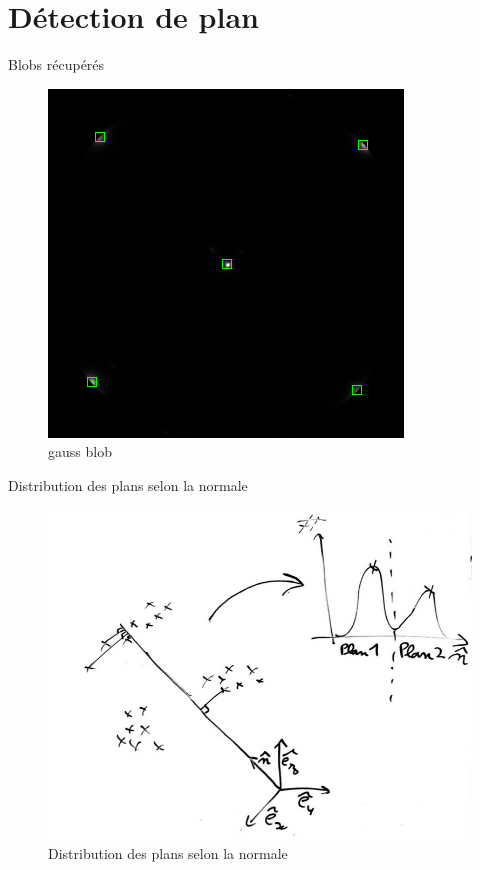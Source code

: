 \documentclass[11pt]{beamer}
\begin{document}
\section{Détection de plan}
\begin{frame}{Blobs récupérés}

\begin{figure}[hbtp]
\centering
\includegraphics[width=.5\columnwidth]{blob.png}
\caption{gauss blob}
\end{figure}

\end{frame}


\begin{frame}{Distribution des plans selon la normale}

\begin{figure}[hbtp]
\centering
\includegraphics[width=.7\textwidth]{normal_to_hist.png}
\caption{Distribution des plans selon la normale}
\end{figure}
\end{frame}
\end{document}
